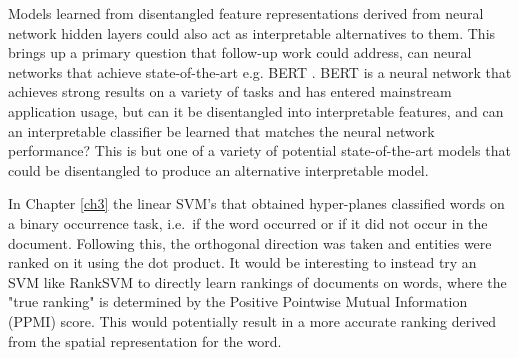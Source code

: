 
Models learned from disentangled feature representations derived from neural network hidden layers could also act as interpretable alternatives to them. This brings up a primary question that follow-up work could address, can neural networks that achieve state-of-the-art e.g. BERT \cite{Kenton1953}. BERT is a neural network that achieves strong results on a variety of tasks and has entered mainstream application usage,  but can it be disentangled into interpretable features, and can an interpretable classifier be learned that matches the neural network performance? This is but one of a variety of potential  state-of-the-art models that could be disentangled  to produce an alternative interpretable model.


In Chapter \ref{ch3} the linear SVM's that obtained hyper-planes classified words on a binary occurrence task, i.e.\ if the word occurred or if it did not occur in the document. Following this, the orthogonal direction was taken and entities were ranked on it using the dot product. It would be interesting to instead try an SVM like RankSVM \cite{Lee2012} to directly learn rankings of documents on words, where the "true ranking" is determined by the Positive Pointwise Mutual Information (PPMI) score. This would potentially result in a more accurate ranking derived from the spatial representation for the word.



